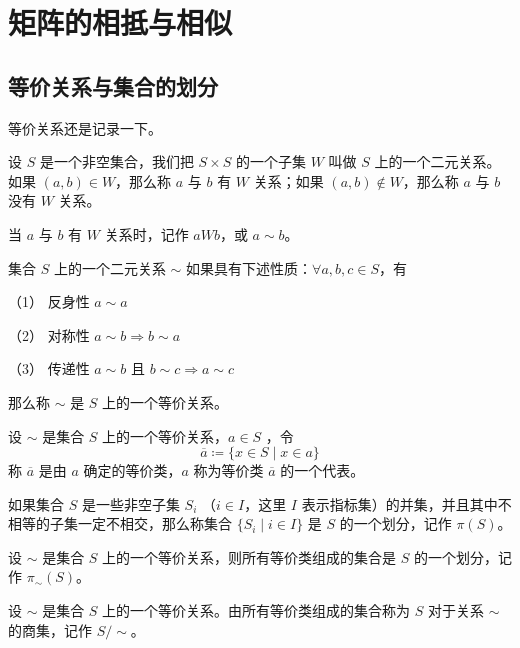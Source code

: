 \chapter{矩阵的相抵与相似}

\section{等价关系与集合的划分}

等价关系还是记录一下。

\begin{definition}
	设 $S$ 是一个非空集合，我们把 $S\times S$ 的一个子集 $W$ 叫做 $S$ 上的一个二元关系。如果 $(a,b)\in W$，那么称 $a$ 与 $b$ 有 $W$ 关系；如果 $(a,b)\notin W$，那么称 $a$ 与 $b$ 没有 $W$ 关系。
\end{definition}

当 $a$ 与 $b$ 有 $W$ 关系时，记作 $aWb$，或 $a\sim b$。

\begin{definition}
	集合 $S$ 上的一个二元关系 $\sim$ 如果具有下述性质：$\forall a,b,c\in S$，有
	
	（1） 反身性 $a\sim a$
	
	（2） 对称性 $a\sim b \Rightarrow b\sim a$
	
	（3） 传递性 $a\sim b$ 且 $b\sim c \Rightarrow a\sim c$
	
	那么称 $\sim$ 是 $S$ 上的一个等价关系。
\end{definition}

\begin{definition}
	设 $\sim$ 是集合 $S$ 上的一个等价关系，$a\in S$ ，令
	\[\overline{a} \coloneqq  \{x\in S \mid x\in a\}\]
	称 $\overline{a}$ 是由 $a$ 确定的等价类，$a$ 称为等价类 $\overline{a}$ 的一个代表。
\end{definition}

\begin{definition}
	如果集合 $S$ 是一些非空子集 $S_i$ （$i\in I$，这里 $I$ 表示指标集）的并集，并且其中不相等的子集一定不相交，那么称集合 $\{S
		_i \mid i\in I\}$ 是 $S$ 的一个划分，记作 $\pi(S)$。
\end{definition}

\begin{theorem}
	设 $\sim$ 是集合 $S$ 上的一个等价关系，则所有等价类组成的集合是 $S$ 的一个划分，记作 $\pi_\sim(S)$。
\end{theorem}

\begin{definition}
	设 $\sim$ 是集合 $S$ 上的一个等价关系。由所有等价类组成的集合称为 $S$ 对于关系 $\sim$ 的商集，记作 $S/\sim$。
\end{definition}

